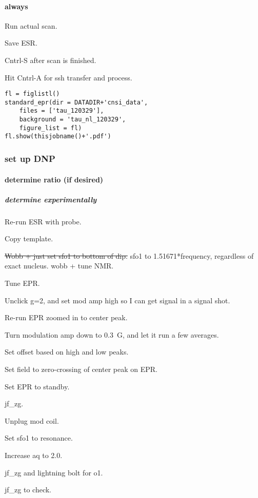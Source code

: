 \paragraph{always}
Run actual scan.

Save ESR.

Cntrl-S after scan is finished.

Hit Cntrl-A for ssh transfer and process.


\begin{tiny}
\begin{lstlisting}
fl = figlistl()
standard_epr(dir = DATADIR+'cnsi_data',
    files = ['tau_120329'],
    background = 'tau_nl_120329',
    figure_list = fl)
fl.show(thisjobname()+'.pdf')
\end{lstlisting}
\end{tiny}

\subsubsection{set up DNP}
\paragraph{determine ratio (if desired)}

\subparagraph{determine experimentally}
Re-run ESR with probe.

Copy template.

\sout{ Wobb + just set sfo1 to bottom of dip. }
sfo1 to 1.51671*frequency, regardless of exact nucleus.
wobb + tune NMR.

Tune EPR.

Unclick g=2, and set mod amp high so I can get signal in a signal shot.

Re-run EPR zoomed in to center peak.

Turn modulation amp down to 0.3~G, and let it run a few averages.

Set offset based on high and low peaks.

Set field to zero-crossing of center peak on EPR.

Set EPR to standby.

jf\_zg.

Unplug mod coil.

Set sfo1 to resonance.

Increase aq to 2.0.  

jf\_zg and lightning bolt for o1.  

jf\_zg to check.

